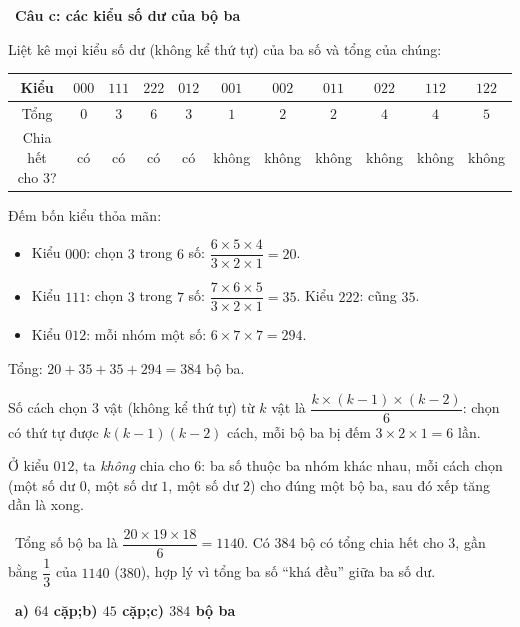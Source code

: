 \documentclass[11pt]{article}
\providecommand{\AnsWord}{Đáp số}
\newcommand{\ans}[1]{\par\smallskip{\bfseries\color{tmGreen!88!black}\AnsWord:}\ {\bfseries\color{AnsRed}#1}\par}
\newcommand{\step}[2]{\par\smallskip\noindent{\bfseries\color{tmBlue!85!black}\StepWord~#1.}\ {\bfseries #2}\par\nopagebreak}
\newcommand{\verify}[1]{\par\smallskip\noindent{\bfseries\color{tmGreen!80!black}\faCheckCircle\ \CheckWord}\ #1\par}
\def\AnsWord{Đáp số}
\def\StepWord{Bước}
\def\CheckWord{Thử lại:}
\begin{document}
{\step{4}{Câu c: các kiểu số dư của bộ ba}
Liệt kê mọi kiểu số dư (không kể thứ tự) của ba số và tổng của chúng:
\begin{center}\begin{tabular}{|c|c|c|c|c|c|c|c|c|c|c|}\hline
Kiểu & $000$ & $111$ & $222$ & $012$ & $001$ & $002$ & $011$ & $022$ & $112$ & $122$\\\hline
Tổng & $0$ & $3$ & $6$ & $3$ & $1$ & $2$ & $2$ & $4$ & $4$ & $5$\\\hline
Chia hết cho $3$? & có & có & có & có & không & không & không & không & không & không\\\hline
\end{tabular}\end{center}
Đếm bốn kiểu thỏa mãn:
\begin{itemize}[leftmargin=1.2em,itemsep=1pt,topsep=2pt]
\item Kiểu $000$: chọn $3$ trong $6$ số: $\dfrac{6\times5\times4}{3\times2\times1}=20$.
\item Kiểu $111$: chọn $3$ trong $7$ số: $\dfrac{7\times6\times5}{3\times2\times1}=35$. Kiểu $222$: cũng $35$.
\item Kiểu $012$: mỗi nhóm một số: $6\times7\times7=294$.
\end{itemize}
Tổng: $20+35+35+294=384$ bộ ba.
\begin{recallbox}Số cách chọn $3$ vật (không kể thứ tự) từ $k$ vật là $\dfrac{k\times(k-1)\times(k-2)}{6}$: chọn có thứ tự được
$k(k-1)(k-2)$ cách, mỗi bộ ba bị đếm $3\times2\times1=6$ lần.\end{recallbox}
\begin{warnbox}Ở kiểu $012$, ta \emph{không} chia cho $6$: ba số thuộc ba nhóm khác nhau, mỗi cách chọn (một số dư $0$, một số dư $1$,
một số dư $2$) cho đúng một bộ ba, sau đó xếp tăng dần là xong.\end{warnbox}
\verify{Tổng số bộ ba là $\dfrac{20\times19\times18}{6}=1140$. Có $384$ bộ có tổng chia hết cho $3$, gần bằng $\dfrac13$ của $1140$ ($380$),
hợp lý vì tổng ba số ``khá đều'' giữa ba số dư.}
\ans{a) $64$ cặp;\quad b) $45$ cặp;\quad c) $384$ bộ ba}
}
\end{document}
